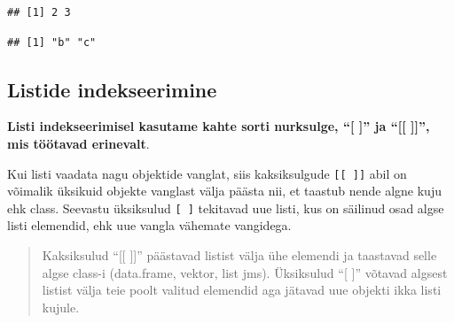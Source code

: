 \documentclass[]{book}
\newenvironment{Shaded}{\begin{snugshade}}{\end{snugshade}}
\newcommand{\KeywordTok}[1]{\textcolor[rgb]{0.13,0.29,0.53}{\textbf{#1}}}
\newcommand{\DataTypeTok}[1]{\textcolor[rgb]{0.13,0.29,0.53}{#1}}
\newcommand{\DecValTok}[1]{\textcolor[rgb]{0.00,0.00,0.81}{#1}}
\newcommand{\StringTok}[1]{\textcolor[rgb]{0.31,0.60,0.02}{#1}}
\newcommand{\CommentTok}[1]{\textcolor[rgb]{0.56,0.35,0.01}{\textit{#1}}}
\newcommand{\OperatorTok}[1]{\textcolor[rgb]{0.81,0.36,0.00}{\textbf{#1}}}
\newcommand{\NormalTok}[1]{#1}
\begin{document}
\begin{Shaded}
\end{Shaded}

\begin{verbatim}
## [1] 2 3
\end{verbatim}

\begin{Shaded}
\end{Shaded}

\begin{verbatim}
## [1] "b" "c"
\end{verbatim}

\subsection{Listide indekseerimine}\label{listide-indekseerimine}

\textbf{Listi indekseerimisel kasutame kahte sorti nurksulge, ``{[}
{]}'' ja ``{[}{[} {]}{]}'', mis töötavad erinevalt}.

Kui listi vaadata nagu objektide vanglat, siis kaksiksulgude
\texttt{{[}{[}\ {]}{]}} abil on võimalik üksikuid objekte vanglast välja
päästa nii, et taastub nende algne kuju ehk class. Seevastu üksiksulud
\texttt{{[}\ {]}} tekitavad uue listi, kus on säilinud osad algse listi
elemendid, ehk uue vangla vähemate vangidega.

\begin{quote}
Kaksiksulud ``{[}{[} {]}{]}'' päästavad listist välja ühe elemendi ja
taastavad selle algse class-i (data.frame, vektor, list jms). Üksiksulud
``{[} {]}'' võtavad algsest listist välja teie poolt valitud elemendid
aga jätavad uue objekti ikka listi kujule.
\end{quote}
\end{document}
